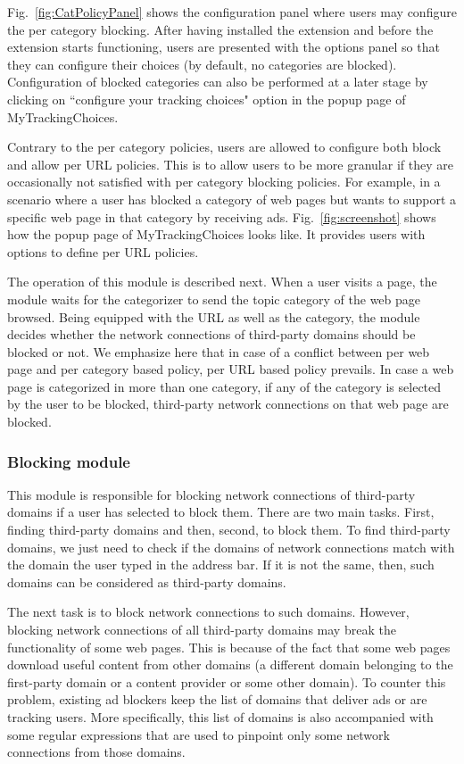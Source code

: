 \documentclass[conference]{IEEEtran}
\begin{document}
Fig.~\ref{fig:CatPolicyPanel} shows the configuration panel where users may configure the per category blocking.
After having installed the extension and before the extension starts functioning, users are presented with the options panel so that they can configure their choices (by default, no categories are blocked). 
Configuration of blocked categories can also be performed at a later stage by clicking on ``configure your tracking choices" option in the popup page of MyTrackingChoices.


Contrary to the per category policies, users are allowed to configure both block and allow per URL policies.
This is to allow users to be more granular if they are occasionally not satisfied with per category blocking policies.
For example, in a scenario where a user has blocked a category of web pages but wants to support a specific web page in that category by receiving ads.
Fig.~\ref{fig:screenshot} shows how the popup page of MyTrackingChoices looks like.
It provides users with options to define per URL policies.

The operation of this module is described next.
When a user visits a page, the module waits for the categorizer to send the topic category of the web page browsed.
Being equipped with the URL as well as the category, the module decides whether the network connections of third-party domains should be blocked or not.
We emphasize here that in case of a conflict between per web page and per category based policy, per URL based policy prevails.
In case a web page is categorized in more than one category, if any of the category is selected by the user to be blocked, third-party network connections on that web page are blocked.




\subsubsection{Blocking module}
This module is responsible for blocking network connections of third-party domains if a user has selected to block them.
There are two main tasks.
First, finding third-party domains and then, second, to block them.
To find third-party domains, we just need to check if the domains of network connections match with the domain the user typed in the address bar.
If it is not the same, then, such domains can be considered as third-party domains.

The next task is to block network connections to such domains.
However, blocking network connections of all third-party domains may break the functionality of some web pages.
This is because of the fact that some web pages download useful content from other domains (a different domain belonging to the first-party domain or a content provider or some other domain).
To counter this problem, existing ad blockers keep the list of domains that deliver ads or are tracking users.
More specifically, this list of domains is also accompanied with some regular expressions that are used to pinpoint only some network connections from those domains.
\end{document}
